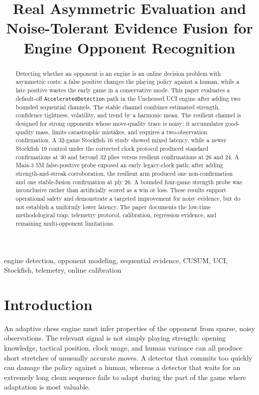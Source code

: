\documentclass[conference]{IEEEtran}
\title{Real Asymmetric Evaluation and Noise-Tolerant Evidence Fusion for Engine Opponent Recognition}
\author{\IEEEauthorblockN{Manus AI}\IEEEauthorblockA{Unchessed-UCI Engine Research Series\\
Unarchitectured Metal Integration Track}}
\begin{document}
\maketitle

\begin{abstract}
Detecting whether an opponent is an engine is an online decision problem with asymmetric costs: a false positive changes the playing policy against a human, while a late positive wastes the early game in a conservative mode. This paper evaluates a default-off \texttt{AcceleratedDetection} path in the Unchessed UCI engine after adding two bounded sequential channels. The stable channel combines estimated strength, confidence tightness, volatility, and trend by a harmonic mean. The resilient channel is designed for strong opponents whose move-quality trace is noisy: it accumulates good-quality mass, limits catastrophic mistakes, and requires a two-observation confirmation. A 32-game Stockfish 16 study showed mixed latency, while a newer Stockfish 19 control under the corrected clock protocol produced standard confirmations at 30 and beyond 32 plies versus resilient confirmations at 26 and 24. A Maia-3 5M false-positive probe exposed an early legacy-clock path; after adding strength-and-streak corroboration, the resilient arm produced one non-confirmation and one stable-fusion confirmation at ply 26. A bounded four-game strength probe was inconclusive rather than artificially scored as a win or loss. These results support operational safety and demonstrate a targeted improvement for noisy evidence, but do not establish a uniformly lower latency. The paper documents the low-time methodological trap, telemetry protocol, calibration, regression evidence, and remaining multi-opponent limitations.
\end{abstract}

\begin{IEEEkeywords}
engine detection, opponent modeling, sequential evidence, CUSUM, UCI, Stockfish, telemetry, online calibration
\end{IEEEkeywords}

\section{Introduction}
An adaptive chess engine must infer properties of the opponent from sparse, noisy observations. The relevant signal is not simply playing strength: opening knowledge, tactical position, clock usage, and human variance can all produce short stretches of unusually accurate moves. A detector that commits too quickly can damage the policy against a human, whereas a detector that waits for an extremely long clean sequence fails to adapt during the part of the game where adaptation is most valuable.
\end{document}
